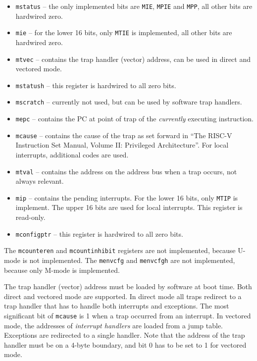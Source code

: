 \documentclass[12pt]{article}
\begin{document}
\begin{itemize}
\item \texttt{mstatus} -- the only implemented bits are \texttt{MIE}, \texttt{MPIE} and \texttt{MPP}, all other bits are hardwired zero.
\item \texttt{mie} -- for the lower 16 bits, only \texttt{MTIE} is implemented, all other bits are hardwired zero.
\item \texttt{mtvec} -- contains the trap handler (vector) address, can be used in direct and vectored mode.
\item \texttt{mstatush} -- this register is hardwired to all zero bits.
\item \texttt{mscratch} -- currently not used, but can be used by software trap handlers.
\item \texttt{mepc} -- contains the PC at point of trap of the \emph{currently} executing instruction.
\item \texttt{mcause} -- contains the cause of the trap as set forward in ``The RISC-V Instruction Set Manual, Volume II: Privileged Architecture''. For local interrupts, additional codes are used.
\item \texttt{mtval} -- contains the address on the address bus when a trap occurs, not always relevant.
\item \texttt{mip} -- contains the pending interrupts. For the lower 16 bits, only \texttt{MTIP} is implement. The upper 16 bits are used for local interrupts. This register is read-only.
\item \texttt{mconfigptr} -- this register is hardwired to all zero bits.
\end{itemize}

The \texttt{mcounteren} and \texttt{mcountinhibit} registers are not implemented, because U-mode is not implemented. The \texttt{menvcfg} and \texttt{menvcfgh} are not implemented, because only M-mode is implemented.

The trap handler (vector) address must be loaded by software at boot time. Both direct and vectored mode are supported. In direct mode all traps redirect to a trap handler that has to handle both interrupts and exceptions. The most significant bit of \texttt{mcause} is 1 when a trap occurred from an interrupt. In vectored mode, the addresses of \emph{interrupt handlers} are loaded from a jump table. Exceptions are redirected to a single handler. Note that the address of the trap handler must be on a 4-byte boundary, and bit 0 has to be set to 1 for vectored mode.
\end{document}
